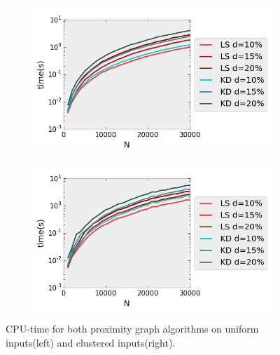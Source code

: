 \begin{figure}[H] 
  \begin{subfigure}[b]{0.5\linewidth}
    \centering
    \includegraphics[width=0.9\linewidth]{Pictures/unif_kd_ls_t} 
    \label{fig:unif_kd_ls_t} 
    \vspace{4ex}
  \end{subfigure}%
  \begin{subfigure}[b]{0.5\linewidth}
    \centering
    \includegraphics[width=0.9\linewidth]{Pictures/clus_kd_ls_t} 
    \label{fig:clus_kd_ls_t} 
    \vspace{4ex}
  \end{subfigure}
  \caption[CPU-time for Line Sweep and $k$-d Tree range search.]{CPU-time for both proximity graph algorithms on uniform inputs(left) and clustered inputs(right).}
  \label{fig:kd_ls_t} 
\end{figure}


